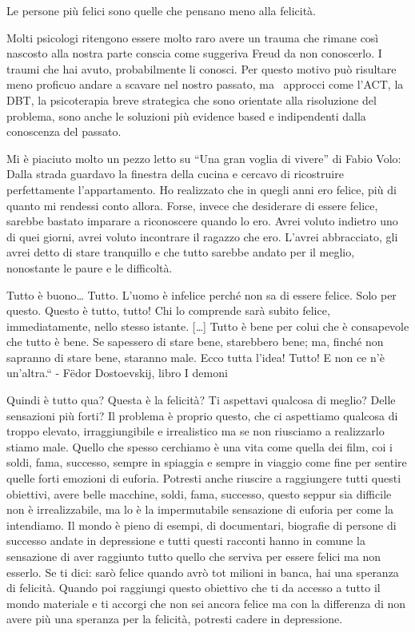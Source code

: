 \documentclass[12pt]{book} %
\begin{document}
Le persone più felici sono quelle che pensano meno alla felicità.

Molti psicologi ritengono essere molto raro avere un trauma che rimane così nascosto alla nostra parte conscia come
suggeriva Freud da non conoscerlo. I traumi che hai avuto, probabilmente li conosci. Per questo motivo può risultare
meno proficuo andare a scavare nel nostro passato, ma \ approcci come l'ACT, la DBT, la psicoterapia breve strategica
che sono orientate alla risoluzione del problema, sono anche le soluzioni più evidence based e indipendenti dalla
conoscenza del passato.

Mi è piaciuto molto un pezzo letto su “Una gran voglia di vivere” di
Fabio Volo: Dalla strada guardavo la finestra della cucina e cercavo di ricostruire perfettamente
l'appartamento. Ho realizzato che in quegli anni ero felice, più di quanto mi rendessi conto
allora. Forse, invece che desiderare di essere felice, sarebbe bastato imparare a riconoscere quando lo ero. Avrei
voluto indietro uno di quei giorni, avrei voluto incontrare il ragazzo che ero. L'avrei
abbracciato, gli avrei detto di stare tranquillo e che tutto sarebbe andato per il meglio, nonostante le paure e le
difficoltà. 

Tutto è buono… Tutto. L'uomo è infelice perché non sa di essere felice. Solo per questo. Questo è tutto, tutto! Chi lo
comprende sarà subito felice, immediatamente, nello stesso istante. […] Tutto è bene per colui che è consapevole che
tutto è bene. Se sapessero di stare bene, starebbero bene; ma, finché non sapranno di stare bene, staranno male. Ecco
tutta l'idea! Tutto! E non ce n'è un'altra.“ - Fëdor Dostoevskij, libro I demoni

Quindi è tutto qua? Questa è la felicità? Ti aspettavi qualcosa di meglio? Delle sensazioni più forti? Il problema è
proprio questo, che ci aspettiamo qualcosa di troppo elevato, irraggiungibile e irrealistico ma se non riusciamo a
realizzarlo stiamo male. Quello che spesso cerchiamo è una vita come quella dei film, coi i soldi, fama, successo,
sempre in spiaggia e sempre in viaggio come fine per sentire quelle forti emozioni di euforia. Potresti anche riuscire
a raggiungere tutti questi obiettivi, avere belle macchine, soldi, fama, successo, questo seppur sia difficile non è
irrealizzabile, ma lo è la impermutabile sensazione di euforia per come la intendiamo. Il mondo è pieno di esempi, di
documentari, biografie di persone di successo andate in depressione e tutti questi racconti hanno in comune la
sensazione di aver raggiunto tutto quello che serviva per essere felici ma non esserlo. Se ti dici: sarò felice quando
avrò tot milioni in banca, hai una speranza di felicità. Quando poi raggiungi questo obiettivo che ti da accesso a
tutto il mondo materiale e ti accorgi che non sei ancora felice ma con la differenza di non avere più una speranza per
la felicità, potresti cadere in depressione.
\end{document}
